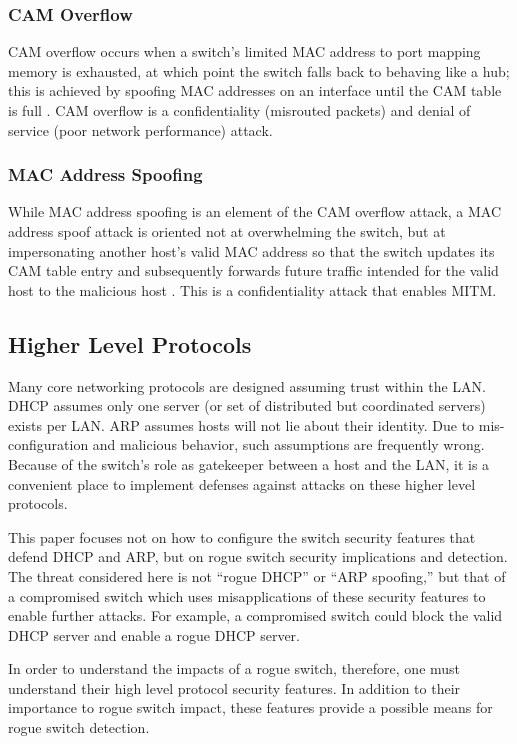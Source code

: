 \documentclass[journal]{IEEEtran}
\begin{document}
\subsubsection{CAM Overflow} CAM overflow occurs when a switch's limited MAC address to port mapping
memory is exhausted, at which point the switch falls back to behaving like a hub; this is achieved
by spoofing MAC addresses on an interface until the CAM table is full \cite{b1}. CAM overflow is a
confidentiality (misrouted packets) and denial of service (poor network performance) attack.

\subsubsection{MAC Address Spoofing} While MAC address spoofing is an element of the CAM overflow
attack, a MAC address spoof attack is oriented not at overwhelming the switch, but at impersonating
another host's valid MAC address so that the switch updates its CAM table entry and subsequently
forwards future traffic intended for the valid host to the malicious host \cite{b1}. This is a
confidentiality attack that enables MITM.

\subsection{Higher Level Protocols}
Many core networking protocols are designed assuming trust within the LAN. DHCP assumes only one
server (or set of distributed but coordinated servers) exists per LAN. ARP assumes hosts will not
lie about their identity. Due to mis-configuration and malicious behavior, such assumptions are
frequently wrong. Because of the switch's role as gatekeeper between a host and the LAN, it is a
convenient place to implement defenses against attacks on these higher level protocols.

This paper focuses not on how to configure the switch security features that defend DHCP and ARP,
but on rogue switch security implications and detection. The threat considered here is not ``rogue
DHCP'' or ``ARP spoofing,'' but that of a compromised switch which uses misapplications of these
security features to enable further attacks. For example, a compromised switch could block the valid
DHCP server and enable a rogue DHCP server.

In order to understand the impacts of a rogue switch, therefore, one must understand their high
level protocol security features. In addition to their importance to rogue switch impact, these
features provide a possible means for rogue switch detection.
\end{document}

